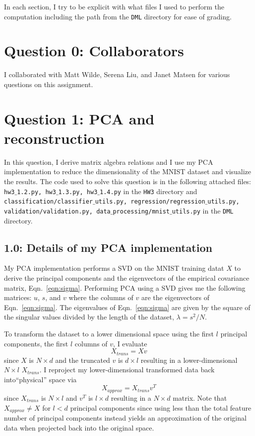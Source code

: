 \documentclass[12pt]{amsart}
\begin{document}
In each section, I try to be explicit with what files I used to perform the computation including the path from the {\tt DML} directory for ease of grading.

\section*{Question 0: Collaborators}
I collaborated with Matt Wilde, Serena Liu, and Janet Matsen for various questions on this assignment.


\section*{Question 1: PCA and reconstruction}

In this question, I derive matrix algebra relations and I use my PCA implementation to reduce the dimensionality of the MNIST dataset and visualize the results.  The code used to solve this question is in the following attached files: {\tt hw3$\_$1.2.py, hw3$\_$1.3.py, hw3$\_$1.4.py} in the {\tt HW3} directory and {\tt classification/classifier$\_$utils.py, regression/regression$\_$utils.py, validation/validation.py, data$\_$processing/mnist$\_$utils.py} in the {\tt DML} directory.

\subsection*{1.0: Details of my PCA implementation}

My PCA implementation performs a SVD on the MNIST training datat $X$ to derive the principal components and the eigenvectors of the empirical covariance matrix, Eqn.~\ref{eqn:sigma}.   Performing PCA using a SVD gives me the following matrices: $u$, $s$, and $v$ where the columns of $v$ are the eigenvectors of Eqn.~\ref{eqn:sigma}.  The eigenvalues of Eqn.~\ref{eqn:sigma} are given by the square of the singular values divided by the length of the dataset, $\lambda = s^2/N$.

To transform the dataset to a lower dimensional space using the first $l$ principal components, the first $l$ columns of $v$, I evaluate
\begin{equation} \label{eqn:pca_transform}
X_{trans} = Xv
\end{equation}
since $X$ is $N \times d$ and the truncated $v$ is $d \times l$ resulting in a lower-dimensional $N \times l$ $X_{trans}$.  I reproject my lower-dimensional transformed data back into``physical'' space via
\begin{equation} \label{eqn:pca_inverse_transform}
X_{approx} = X_{trans}v^T
\end{equation} 
since $X_{trans}$ is $N \times l$ and $v^T$ is $l \times d$ resulting in a $N \times d$ matrix.  Note that $X_{approx} \neq X$ for $l < d$ principal components since using less than the total feature number of principal components instead yields an approximation of the original data when projected back into the original space.
\end{document}
